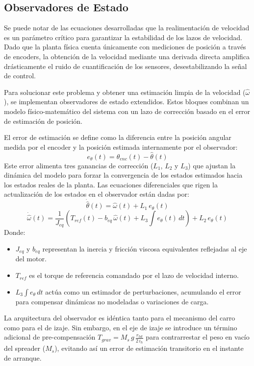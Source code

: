 \documentclass[11pt]{article}                                    %
\begin{document}
\subsection{Observadores de Estado}
Se puede notar de las ecuaciones desarrolladas que la realimentación de velocidad es un parámetro crítico para garantizar la estabilidad de los lazos de velocidad. Dado que la planta física cuenta únicamente con mediciones de posición a través de encoders, la obtención de la velocidad mediante una derivada directa amplifica drásticamente el ruido de cuantificación de los sensores, desestabilizando la señal de control.

Para solucionar este problema y obtener una estimación limpia de la velocidad ($\hat{\omega}$), se implementan observadores de estado extendidos. Estos bloques combinan un modelo físico-matemático del sistema con un lazo de corrección basado en el error de estimación de posición.

El error de estimación se define como la diferencia entre la posición angular medida por el encoder y la posición estimada internamente por el observador:
$$e_{\theta}(t) = \theta_{enc}(t) - \hat{\theta}(t)$$
Este error alimenta tres ganancias de corrección ($L_1$, $L_2$ y $L_3$) que ajustan la dinámica del modelo para forzar la convergencia de los estados estimados hacia los estados reales de la planta. Las ecuaciones diferenciales que rigen la actualización de los estados en el observador están dadas por:
$$\dot{\hat{\theta}}(t) = \hat{\omega}(t) + L_1 \, e_{\theta}(t)$$
$$\dot{\hat{\omega}}(t) = \frac{1}{J_{eq}} \left( T_{ref}(t) - b_{eq} \, \hat{\omega}(t) + L_3 \int e_{\theta}(t) \, dt \right) + L_2 \, e_{\theta}(t)$$
Donde:
\begin{itemize}
    \item $J_{eq}$ y $b_{eq}$ representan la inercia y fricción viscosa equivalentes reflejadas al eje del motor.
    \item $T_{ref}$ es el torque de referencia comandado por el lazo de velocidad interno.
    \item $L_3 \int e_{\theta} \, dt$ actúa como un estimador de perturbaciones, acumulando el error para compensar dinámicas no modeladas o variaciones de carga.
\end{itemize}

La arquitectura del observador es idéntica tanto para el mecanismo del carro como para el de izaje. Sin embargo, en el eje de izaje se introduce un término adicional de pre-compensación $T_{grav} = M_s \, g \, \frac{r_{hd}}{2 \, i_h}$ para contrarrestar el peso en vacío del spreader ($M_s$), evitando así un error de estimación transitorio en el instante de arranque.
\end{document}
